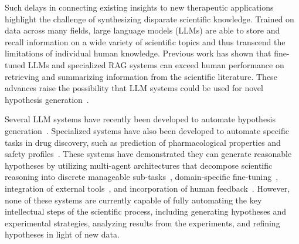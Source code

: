 \documentclass{article}
\begin{document}
Such delays in connecting existing insights to new therapeutic applications highlight the challenge of synthesizing disparate scientific knowledge. Trained on data across many fields, large language models (LLMs) are able to store and recall information on a wide variety of scientific topics and thus transcend the limitations of individual human knowledge. Previous work has shown that fine-tuned LLMs and specialized RAG systems can exceed human performance on retrieving and summarizing information from the scientific literature. These advances raise the possibility that LLM systems could be used for novel hypothesis generation~\cite{taylor_galactica_2022, giglou_llms4synthesis_2024, agarwal_litllm_2025, wang_using_2024}.

Several LLM systems have recently been developed to automate hypothesis generation~\cite{huang_automated_2025, boiko_autonomous_2023, lu_ai_2024, ifargan_autonomous_2024, wang_txgemma_2025, gottweis_towards_2025}. Specialized systems have also been developed to automate specific tasks in drug discovery, such as prediction of pharmacological properties and safety profiles~\cite{gottweis_towards_2025, lu_ai_2024}. These systems have demonstrated they can generate reasonable hypotheses by utilizing multi-agent architectures that decompose scientific reasoning into discrete manageable sub-tasks~\cite{gottweis_towards_2025}, domain-specific fine-tuning~\cite{wang_txgemma_2025, chaves_tx-llm_2024}, integration of external tools~\cite{wang_txgemma_2025, gottweis_towards_2025}, and incorporation of human feedback~\cite{gottweis_towards_2025}. However, none of these systems are currently capable of fully automating the key intellectual steps of the scientific process, including generating hypotheses and experimental strategies, analyzing results from the experiments, and refining hypotheses in light of new data.
\end{document}
